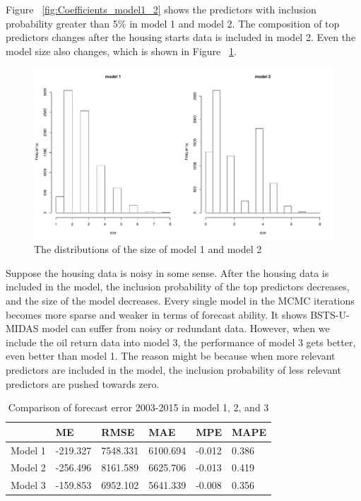 Figure ~\ref{fig:Coefficients_model1_2} shows the predictors with inclusion probability greater than 5\% in model 1 and model 2. The composition of top predictors changes after the housing starts data is included in model 2. Even the model size also changes, which is shown in Figure ~\ref{fig:size_1_2}.


\begin{figure}[ht]
\centering
\includegraphics[width=0.6\linewidth]{Figures/size_1_2}
\caption{The distributions of the size of model 1 and model 2}
\label{fig:size_1_2}
\end{figure}
 
Suppose the housing data is noisy in some sense. After the housing data is included in the model, the inclusion probability of the top predictors decreases, and the size of the model decreases. Every single model in the MCMC iterations becomes more sparse and weaker in terms of forecast ability. It shows BSTS-U-MIDAS model can suffer from noisy or redundant data. However, when we include the oil return data into model 3, the performance of model 3 gets better, even better than model 1. The reason might be because when more relevant predictors are included in the model, the inclusion probability of less relevant predictors are pushed towards zero.   


\begin{table}[ht]
	\centering
	\begin{tabular}{@{}llllll@{}}
		\toprule
		          & ME     & RMSE     & MAE      & MPE      & MAPE     \\ \midrule
		Model 1    & -219.327 & 7548.331 & 6100.694 & -0.012 & 0.386 \\
		Model 2    & -256.496 & 8161.589 & 6625.706 & -0.013 & 0.419  \\ 
		Model 3    & -159.853 & 6952.102 & 5641.339 & -0.008 & 0.356\\ \bottomrule
	\end{tabular}
	\caption{Comparison of forecast error 2003-2015 in model 1, 2, and 3}
	\label{ErrorCom123}
\end{table}

